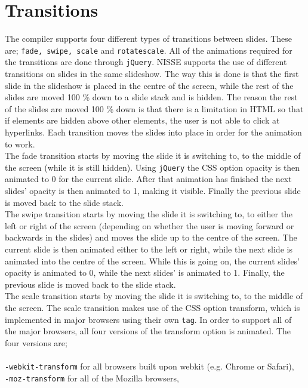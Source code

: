 \section{Transitions}
The compiler supports four different types of transitions between slides. These are; \lstinline!fade, swipe, scale! and \lstinline!rotatescale!. All of the animations required for the transitions are done through \texttt{jQuery}. NISSE supports the use of different transitions on slides in the same slideshow. The way this is done is that the first slide in the slideshow is placed in the centre of the screen, while the rest of the slides are moved 100 \% down to a slide stack and is hidden. The reason the rest of the slides are moved 100 \% down is that there is a limitation in HTML so that if elements are hidden above other elements, the user is not able to click at hyperlinks. Each transition moves the slides into place in order for the animation to work.\\
The fade transition starts by moving the slide it is switching to, to the middle of the screen (while it is still hidden). Using \texttt{jQuery} the CSS option opacity is then animated to 0 for the current slide. After that animation has finished the next slides' opacity is then animated to 1, making it visible. Finally the previous slide is moved back to the slide stack. \\
The swipe transition starts by moving the slide it is switching to, to either the left or right of the screen (depending on whether the user is moving forward or backwards in the slides) and moves the slide up to the centre of the screen. The current slide is then animated either to the left or right, while the next slide is animated into the centre of the screen. While this is going on, the current slides' opacity is animated to 0, while the next slides' is animated to 1. Finally, the previous slide is moved back to the slide stack. \\
The scale transition starts by moving the slide it is switching to, to the middle of the screen. The scale transition makes use of the CSS option transform, which is implemented in major browsers using their own \texttt{tag}. In order to support all of the major browsers, all four versions of the transform option is animated. The four versions are; \\ \\
\texttt{-webkit-transform} for all browsers built upon webkit (e.g. Chrome or Safari), \\
\texttt{-moz-transform} for all of the Mozilla browsers, \\
